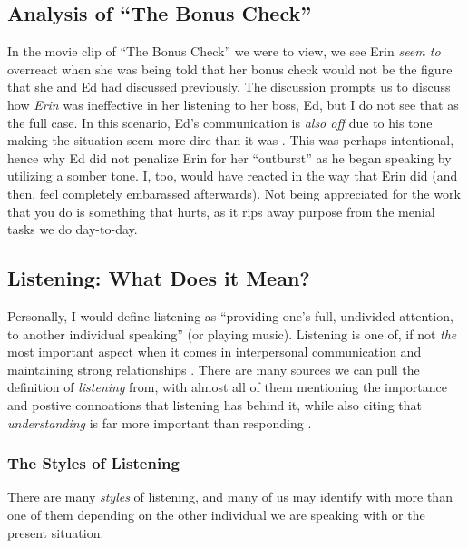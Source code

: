\documentclass[stu,12pt]{apa7}
\begin{document}
    \newpage
    \subsection{Analysis of ``The Bonus Check''}
      In the movie clip of ``The Bonus Check'' we were to view, we see Erin
        \textit{seem to} overreact when she was being told that her bonus check
        would not be the figure that she and Ed had discussed previously. The
        discussion prompts us to discuss how \textit{Erin} was ineffective in
        her listening to her boss, Ed, but I do not see that as the full case.
        In this scenario, Ed's communication is \textit{also off} due to his
        tone making the situation seem more dire than it was
        \parencite{soderbergh_erin_2000}. This was perhaps intentional, hence
        why Ed did not penalize Erin for her ``outburst'' as he began speaking
        by utilizing a somber tone. I, too, would have reacted in the way that
        Erin did (and then, feel completely embarassed afterwards). Not being
        appreciated for the work that you do is something that hurts, as it rips
        away purpose from the menial tasks we do day-to-day.


    \subsection{Listening: What Does it Mean?}
      Personally, I would define listening as ``providing one's full, undivided
        attention, to another individual speaking'' (or playing music).
        Listening is one of, if not \textit{the} most important aspect when it
        comes in interpersonal communication and maintaining strong
        relationships \parencite{bodie_listening_2012}. There are many sources
        we can pull the definition of \textit{listening} from, with almost all
        of them mentioning the importance and postive connoations that listening
        has behind it, while also citing that \textit{understanding} is far more
        important than responding \parencite[pp. 116]{bodie_listening_2012}.

      \subsubsection{The Styles of Listening}
        There are many \textit{styles} of listening, and many of us may identify
          with more than one of them depending on the other individual we are
          speaking with or the present situation.
\end{document}
